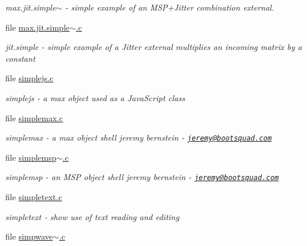 \begin{DoxyCompactItemize}
\begin{DoxyCompactList}\small\item\em max.jit.simple$\sim$ -\/ simple example of an MSP+Jitter combination external. \item\end{DoxyCompactList}\item 
file \hyperlink{max_8jit_8simple~_8c}{max.jit.simple$\sim$.c}


\begin{DoxyCompactList}\small\item\em jit.simple -\/ simple example of a Jitter external multiplies an incoming matrix by a constant \item\end{DoxyCompactList}\item 
file \hyperlink{simplejs_8c}{simplejs.c}


\begin{DoxyCompactList}\small\item\em simplejs -\/ a max object used as a JavaScript class \item\end{DoxyCompactList}\item 
file \hyperlink{simplemax_8c}{simplemax.c}


\begin{DoxyCompactList}\small\item\em simplemax -\/ a max object shell jeremy bernstein -\/ \href{mailto:jeremy@bootsquad.com}{\tt jeremy@bootsquad.com} \item\end{DoxyCompactList}\item 
file \hyperlink{simplemsp~_8c}{simplemsp$\sim$.c}


\begin{DoxyCompactList}\small\item\em simplemsp -\/ an MSP object shell jeremy bernstein -\/ \href{mailto:jeremy@bootsquad.com}{\tt jeremy@bootsquad.com} \item\end{DoxyCompactList}\item 
file \hyperlink{simpletext_8c}{simpletext.c}


\begin{DoxyCompactList}\small\item\em simpletext -\/ show use of text reading and editing \item\end{DoxyCompactList}\item 
file \hyperlink{simpwave~_8c}{simpwave$\sim$.c}



\end{DoxyCompactItemize}
